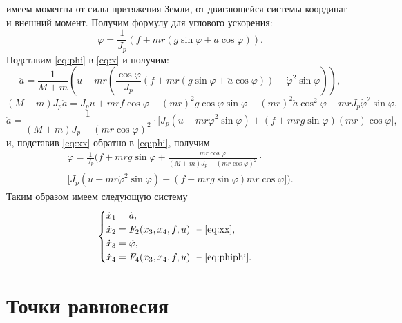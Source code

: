 имеем моменты от силы притяжения Земли, от двигающейся системы координат и внешний момент.
Получим формулу для углового ускорения:
\begin{equation}
    \label{eq:phi}
    \ddot\varphi=\frac{1}{J_p}(f+mr(g\sin\varphi+\ddot a\cos\varphi)).
\end{equation}
Подставим \eqref{eq:phi} в \eqref{eq:x} и получим:
\begin{equation*}
    \ddot a=\frac{1}{M+m}\left(u+mr\left(\frac{\cos\varphi}{J_p}(f+mr(g\sin\varphi+\ddot a\cos\varphi))-\dot\varphi^2\sin\varphi\right)\right),
\end{equation*}
\begin{equation*}
    (M+m)J_p\ddot a=J_pu+mrf\cos\varphi+(mr)^2g\cos\varphi\sin\varphi
    +(mr)^2\ddot a\cos^2\varphi-mrJ_p\dot\varphi^2\sin\varphi,
\end{equation*}
\begin{equation}
    \label{eq:xx}
    \ddot a=\frac{1}{(M+m)J_p-(mr\cos\varphi)^2}\cdot\Big[J_p(u-mr\dot\varphi^2\sin\varphi)+(f+mrg\sin\varphi)(mr)\cos\varphi\Big],
\end{equation}
и, подставив \eqref{eq:xx} обратно в \eqref{eq:phi}, получим
\begin{multline}
    \label{eq:phiphi}
    \ddot\varphi=\frac{1}{J_p}\Bigg(f+mrg\sin\varphi+\frac{mr\cos\varphi}{(M+m)J_p-(mr\cos\varphi)^2}\cdot\\ 
    \Big[J_p(u-mr\dot\varphi^2\sin\varphi)+(f+mrg\sin\varphi)mr\cos\varphi\Big] \Bigg).
\end{multline}
Таким образом имеем следующую систему
\begin{equation}
    \label{eq:origsys}
    \begin{cases}
        \dot x_1 = \dot a,\\
        \dot x_2 = F_2(x_3, x_4, f, u)\text{ ~-- \eqref{eq:xx}},\\
        \dot x_3 = \dot\varphi,\\
        \dot x_4 = F_4(x_3, x_4, f, u)\text{ ~-- \eqref{eq:phiphi}}.
    \end{cases}
\end{equation}


\section{Точки равновесия}

